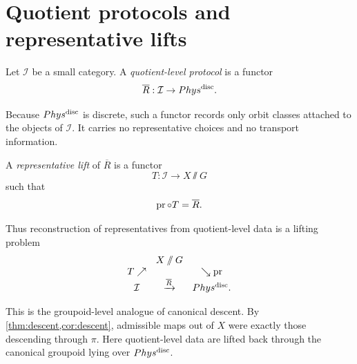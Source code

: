 \section{Quotient protocols and representative lifts}
\begin{definition}
	Let \(\mathcal I\) be a small category.  A
	\emph{quotient-level protocol} is a functor
	\[
		\overline R:\mathcal I\to Phys^{\mathrm{disc}}.
	\]
\end{definition}
Because \(Phys^{\mathrm{disc}}\) is discrete, such a functor records only orbit
classes attached to the objects of \(\mathcal I\).  It carries no
representative choices and no transport information.
\begin{definition}
	A \emph{representative lift} of \(\overline R\) is a functor
	\[
		T:\mathcal I\to X\sslash G
	\]
	such that
	\[
		\operatorname{pr}\circ T=\overline R.
	\]
\end{definition}
Thus reconstruction of representatives from quotient-level data is a
lifting problem
\[
	\begin{array}{ccc}
		           & X\mathbin{/\mkern-6mu/} G                &                \\
		T \nearrow &                           & \searrow \operatorname{pr}   \\
		\mathcal I & \xrightarrow{\overline R} & Phys^{\mathrm{disc}}.
	\end{array}
\]
\begin{remark}
	This is the groupoid-level analogue of canonical descent.  By
	\cref{thm:descent,cor:descent},
	admissible maps out of \(X\) were exactly those descending through
	\(\pi\).  Here quotient-level data are lifted back through the canonical
	groupoid lying over \(Phys^{\mathrm{disc}}\).
\end{remark}
